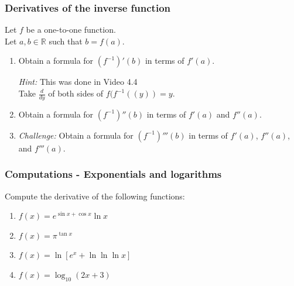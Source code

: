 \begin{frame}[t]
	\frametitle{Derivatives of the inverse function}

	Let $f$ be a one-to-one function. \\ Let $a, b \in \mathbb{R}$ such that $b=f(a
	)$.

	\vfill
	\begin{enumerate}
		\item Obtain a formula for $\displaystyle \left(f^{-1}\right)'(b)$ in terms of
			$\displaystyle f'(a)$.
			\vspace{.2cm}

			{\fontsize{13}{13}\selectfont \emph{Hint:} This was done in Video 4.4 \\ Take $\displaystyle \frac{d}{dy}$ of both sides of \quad $\displaystyle f(f^{-1}( (y)) = y$. }

			\vfill

		\item Obtain a formula for $\displaystyle \left(f^{-1}\right)''(b)$ in terms
			of $\displaystyle f'(a)$ and $\displaystyle f''(a)$.

			\vfill

		\item \emph{Challenge:} Obtain a formula for
			$\displaystyle \left(f^{-1}\right)'''(b)$ in terms of
			$\displaystyle f'(a)$, $\displaystyle f''(a)$, and $\displaystyle f'''(a)$.
	\end{enumerate}
\end{frame}

\begin{frame}[t]
	\frametitle{Computations - Exponentials and logarithms}

	Compute the derivative of the following functions:

	\begin{enumerate}
		\item $\displaystyle f(x) = e^{\sin x + \cos x}\ln x$
			\vfill

		\item $\displaystyle f(x) = \pi^{\tan x}$
			\vfill

		\item $\displaystyle f(x) = \ln \left[ e^{x}+ \ln \ln \ln x \right]$
			\vfill

		\item $\displaystyle f(x) = \log_{10}\left( 2x + 3 \right)$
			\vfill
	\end{enumerate}
\end{frame}

